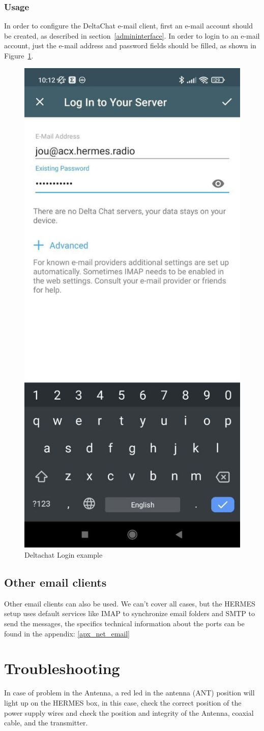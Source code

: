 \documentclass[11pt,a4paper]{article}
\begin{document}
\subsubsection{Usage}

In order to configure the DeltaChat e-mail client, first an e-mail account should be created, as described in section~\ref{admininterface}. In order to login to an e-mail account, just the e-mail address and password fields should be filled, as shown in Figure~\ref{fig:deltachat-login}.

\begin{figure}[H]
    \centering
    \includegraphics[width=0.3\columnwidth]{screenshots/deltachat/en/login.jpg}
    	\caption{Deltachat Login example}
	\vspace{-10pt}
    \label{fig:deltachat-login}
\end{figure}

\subsection{Other email clients}
Other email clients can also be used. We can't cover all cases, but the HERMES setup uses default services like IMAP to synchronize email folders and SMTP to send the messages, the specifics technical information about the ports can be found in the appendix: \ref{apx_net_email}

\section{Troubleshooting}

In case of problem in the Antenna, a red led in the antenna (ANT) position will light up on the HERMES box, in this case, check the correct position of the power supply wires and check the position and integrity of the Antenna, coaxial cable, and the transmitter.
\end{document}
